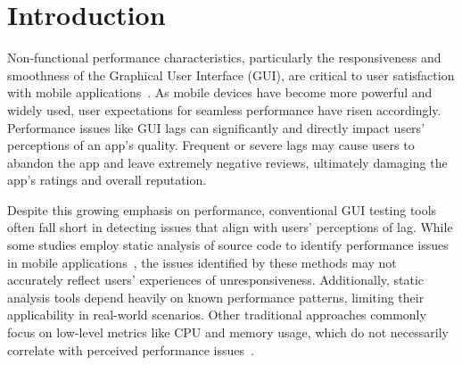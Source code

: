 \section{Introduction}
\label{sec:introduction}

Non-functional performance characteristics, particularly the responsiveness and smoothness of the Graphical User Interface (GUI), are critical to user satisfaction with mobile applications~\cite{2015_IEEE_Software_Mobile_App_Users_Complain, 2018_WWW_Rating_for_App_Reviews, 2022_JSS_What_factors_affect_the_UX_in_mobile_apps}. As mobile devices have become more powerful and widely used, user expectations for seamless performance have risen accordingly. 
Performance issues like GUI lags can significantly and directly impact users' perceptions of an app's quality. Frequent or severe lags may cause users to abandon the app and leave extremely negative reviews, ultimately damaging the app's ratings and overall reputation. 



\begin{comment}
For example, a user left a 1-star review on Google Play, citing performance issues with the WordPress mobile app:
\peter{please, don't add this quote.}\textit{``But now it's \textbf{lagging} and getting \textbf{frozen} at every stage whenever I try to update and compose my story. It's becoming so slow that I'm unable to type a story and it hangs or freezes so much that even if I press backspace or try to exit it doesn't process well. All other sites and platforms are working except this. I'm unable to type and frame my story at all.''}~\cite{WordPress} 
\end{comment}


Despite this growing emphasis on performance, conventional GUI testing tools often fall short in detecting issues that align with users' perceptions of lag. While some studies employ static analysis of source code to identify performance issues in mobile applications~\cite{2014_ICSE_Characterizing_and_detecting_performance_bugs, 2019_EMSE_iPerfDetector,2019_SANER_Characterizing_and_Detecting_Inefficient_Image_Displaying_Issues, 2020_EMSE_statically_detectable_performance_issues, 2021_ICSE_IMGDroid_Detecting_Image_Loading_Defects, 2023_ASE_Detection_Thread_Misuses}, the issues identified by these methods may not accurately reflect users' experiences of unresponsiveness. Additionally, static analysis tools depend heavily on known performance patterns, limiting their applicability in real-world scenarios. Other traditional approaches commonly focus on low-level metrics like CPU and memory usage, which do not necessarily correlate with perceived performance issues~\cite{2022_IST_resource_influences_UI_responsiveness, adb, perfetto}. %

